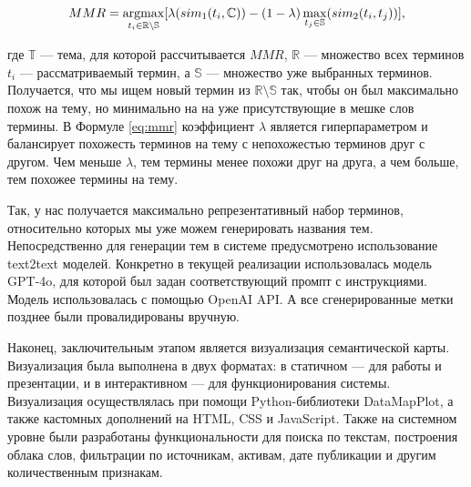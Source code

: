 \begin{equation}\label{eq:mmr}
    MMR =
    \argmax_{
        t_i \in \mathbb{R} \setminus \mathbb{S}
    }[
        \lambda(sim_1(t_i,\mathbb{C})) - (1 - \lambda)\max_{t_j \in \mathbb{S}}(sim_2(t_i, t_j))
    ],
\end{equation}

где $\mathbb{T}$ --- тема, для которой рассчитывается $MMR$, $\mathbb{R}$ --- множество всех терминов $t_i$ --- рассматриваемый термин,
а $\mathbb{S}$ — множество уже выбранных терминов. Получается, что мы ищем новый термин из $\mathbb{R} \setminus \mathbb{S}$ так,
чтобы он был максимально похож на тему, но минимально на на уже присутствующие в мешке слов термины. В Формуле \ref{eq:mmr}
коэффициент $\lambda$ является гиперпараметром и балансирует похожесть терминов на тему с непохожестью терминов друг с другом.
Чем меньше $\lambda$, тем термины менее похожи друг на друга, а чем больше, тем похожее термины на тему.

Так, у нас получается максимально репрезентативный набор терминов, относительно которых мы уже можем генерировать названия тем.
Непосредственно для генерации тем в системе предусмотрено использование text2text моделей. Конкретно в текущей реализации
использовалась модель GPT-4o, для которой был задан соответствующий промпт с инструкциями.
Модель использовалась с помощью OpenAI API. А все сгенерированные метки позднее были провалидированы вручную.

Наконец, заключительным этапом является визуализация семантической карты. Визуализация была выполнена
в двух форматах: в статичном --- для работы и презентации, и в интерактивном --- для функционирования системы.
Визуализация осуществлялась при помощи Python-библиотеки DataMapPlot, а также кастомных дополнений на HTML,
CSS и JavaScript. Также на системном уровне были разработаны функциональности для поиска по текстам,
построения облака слов, фильтрации по источникам, активам, дате публикации и другим количественным признакам.